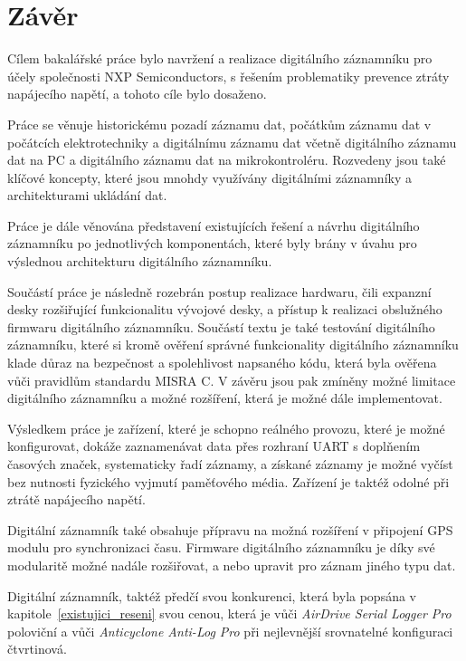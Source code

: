 \chapter{Závěr}
\label{zaver}
Cílem bakalářské práce bylo navržení a realizace digitálního záznamníku pro účely společnosti NXP Semiconductors, s řešením problematiky prevence ztráty napájecího napětí, a tohoto cíle bylo dosaženo.

Práce se věnuje historickému pozadí záznamu dat, počátkům záznamu dat v počátcích elektrotechniky a digitálnímu záznamu dat včetně digitálního záznamu dat na PC a digitálního záznamu dat na mikrokontroléru. Rozvedeny jsou také klíčové koncepty, které jsou mnohdy využívány digitálními záznamníky a architekturami ukládání dat.

Práce je dále věnována představení existujících řešení a návrhu digitálního záznamníku po jednotlivých komponentách, které byly brány v úvahu pro výslednou architekturu digitálního záznamníku.

Součástí práce je následně rozebrán postup realizace hardwaru, čili expanzní desky rozšiřující funkcionalitu vývojové desky, a přístup k realizaci obslužného firmwaru digitálního záznamníku. Součástí textu je také testování digitálního záznamníku, které si kromě ověření správné funkcionality digitálního záznamníku klade důraz na bezpečnost a spolehlivost napsaného kódu, která byla ověřena vůči pravidlům standardu MISRA C. V závěru jsou pak zmíněny možné limitace digitálního záznamníku a možné rozšíření, která je možné dále implementovat.

Výsledkem práce je zařízení, které je schopno reálného provozu, které je možné konfigurovat, dokáže zaznamenávat data přes rozhraní UART s doplňením časových značek, systematicky řadí záznamy, a získané záznamy je možné vyčíst bez nutnosti fyzického vyjmutí paměťového média. Zařízení je taktéž odolné při ztrátě napájecího napětí. 

Digitální záznamník také obsahuje přípravu na možná rozšíření v připojení GPS modulu pro synchronizaci času. Firmware digitálního záznamníku je díky své modularitě možné nadále rozšiřovat, a nebo upravit pro záznam jiného typu dat.

Digitální záznamník, taktéž předčí svou konkurenci, která byla popsána v kapitole~\ref{existujici_reseni} svou cenou, která je vůči \textit{AirDrive Serial Logger Pro} poloviční a vůči \textit{Anticyclone Anti-Log Pro} při nejlevnější srovnatelné konfiguraci čtvrtinová.


%
